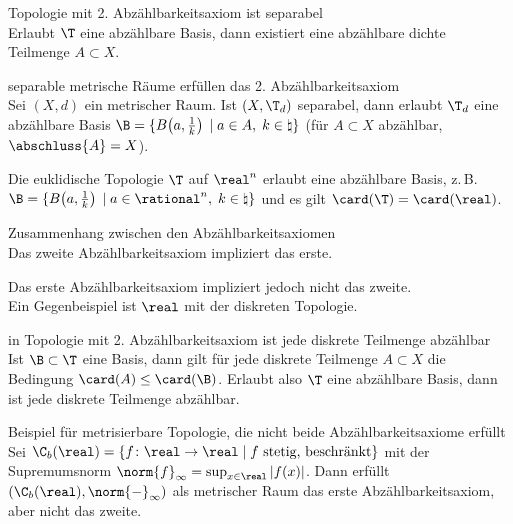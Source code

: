 \begin{Satz}{Topologie mit 2. Abzählbarkeitsaxiom ist separabel}\\
    Erlaubt $\T$ eine abzählbare Basis, dann existiert eine
    abzählbare dichte Teilmenge $A \subset X$.
\end{Satz}

\begin{Satz}{separable metrische Räume erfüllen das 2. Abzählbarkeitsaxiom}\\
    Sei $(X, d)$ ein metrischer Raum.
    Ist $(X, \T_d)$ separabel, dann erlaubt $\T_d$ eine abzählbare Basis
    $\B = \{B\!\left(a, \frac{1}{k}\right) \;|\; a \in A,\; k \in \natural\}$
    (für $A \subset X$ abzählbar, $\abschluss{A} = X$).
\end{Satz}

\begin{Kor}
    Die euklidische Topologie $\T$ auf $\real^n$ erlaubt eine abzählbare Basis,
    z.\,B. \\
    $\B = \{B\!\left(a, \frac{1}{k}\right) \;|\; a \in \rational^n,\;
    k \in \natural\}$
    und es gilt $\card(\T) = \card(\real)$.
\end{Kor}

\linie
\pagebreak

\begin{Satz}{Zusammenhang zwischen den Abzählbarkeitsaxiomen}\\
    Das zweite Abzählbarkeitsaxiom impliziert das erste.
\end{Satz}

\begin{Bem}
    Das erste Abzählbarkeitsaxiom impliziert jedoch nicht das zweite. \\
    Ein Gegenbeispiel ist $\real$ mit der diskreten Topologie.
\end{Bem}

\begin{Lemma}{in Topologie mit 2. Abzählbarkeitsaxiom ist jede diskrete
              Teilmenge abzählbar}\\
    Ist $\B \subset \T$ eine Basis, dann gilt für jede diskrete Teilmenge
    $A \subset X$ die Bedingung $\card(A) \le \card(\B)$.
    Erlaubt also $\T$ eine abzählbare Basis, dann ist jede diskrete Teilmenge
    abzählbar.
\end{Lemma}

\begin{Satz}{Beispiel für metrisierbare Topologie,
             die nicht beide Abzählbarkeitsaxiome erfüllt}\\
    Sei $\C_b(\real) = \{f\colon \real \rightarrow \real \;|\;
    f \text{ stetig, beschränkt}\}$ mit der Supremumsnorm
    $\norm{f}_\infty = \sup_{x \in \real} |f(x)|$.
    Dann erfüllt $(\C_b(\real), \norm{-}_\infty)$ als metrischer Raum das
    erste Abzählbarkeitsaxiom, aber nicht das zweite.
\end{Satz}

